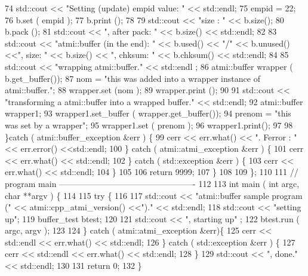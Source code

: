 \begin{DoxyCodeInclude}
74         std::cout << "Setting (update) empid value: " << std::endl;
75         empid = 22;
76         b.set ( empid );
77         b.print ();
78 
79         std::cout << "size : " << b.size();
80         b.pack ();
81         std::cout << ", after pack: " << b.size() << std::endl;
82 
83         std::cout << "atmi::buffer (in the end): " << b.used() << "/" << b.unused() <<", size: " <<
       b.size() << ", chksum: " << b.chksum() <<  std::endl;
84 
85         std::cout << "wrapping atmi::buffer." << std::endl ;
86         atmi::buffer wrapper ( b.get\_buffer());
87         nom = "this was added into a wrapper instance of atmi::buffer.";
88         wrapper.set (nom );
89         wrapper.print ();
90 
91         std::cout << "transforming a atmi::buffer into a wrapped buffer." << std::endl;
92         atmi::buffer wrapper1;
93         wrapper1.set\_buffer ( wrapper.get\_buffer());
94         prenom = "this was set by a wrapper";
95         wrapper1.set ( prenom );
96         wrapper1.print();
97 
98       \}catch ( atmi::buffer\_exception &err ) \{
99         cerr << err.what() << ". Ferror : " << err.error() <<std::endl;
100       \} catch ( atmi::atmi\_exception &err ) \{
101         cerr << err.what() << std::endl;
102       \} catch ( std::exception &err ) \{
103         cerr << err.what() << std::endl;
104       \}
105 
106       return 9999;
107     \}
108 
109 \};
110 
111 // program main -------------------------------------------------
112 
113 int main ( int argc, char **argv ) \{
114 
115   try \{
116 
117     std::cout << "atmi::buffer sample program (" << atmi::cpp\_atmi\_version() <<")." << std::endl;
118     std::cout << "setting up";
119     buffer\_test btest;
120 
121     std::cout << ", starting up" ;
122     btest.run ( argc, argv );
123 
124   \} catch ( atmi::atmi\_exception &err)\{
125     cerr << std::endl << err.what() << std::endl;
126   \} catch ( std::exception &err ) \{
127     cerr << std::endl << err.what() << std::endl;
128   \}
129   std::cout << ", done." << std::endl;
130 
131   return 0;
132 \}
\end{DoxyCodeInclude}
 